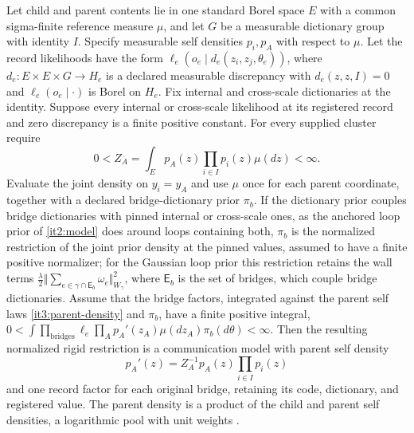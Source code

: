 Let child and parent contents lie in one standard Borel space $E$ with a common sigma-finite reference measure $\mu$, and let $G$ be a measurable dictionary group with identity $I$. Specify measurable self densities $p_i,p_A$ with respect to $\mu$. Let the record likelihoods have the form $\ell_e(o_e\mid d_e(z_i,z_j,\theta_e))$, where $d_e:E\times E\times G\to H_e$ is a declared measurable discrepancy with $d_e(z,z,I)=0$ and $\ell_e(o_e\mid\cdot)$ is Borel on $H_e$. Fix internal and cross-scale dictionaries at the identity. Suppose every internal or cross-scale likelihood at its registered record and zero discrepancy is a finite positive constant. For every supplied cluster require
\begin{equation}
0<Z_A=\int_E p_A(z)\prod_{i\in I}p_i(z)\mu(dz)<\infty.
\label{it3:rigid-normalizer}
\end{equation}
Evaluate the joint density on $y_i=y_A$ and use $\mu$ once for each parent coordinate, together with a declared bridge-dictionary prior $\pi_b$. If the dictionary prior couples bridge dictionaries with pinned internal or cross-scale ones, as the anchored loop prior of \cref{it2:model} does around loops containing both, $\pi_b$ is the normalized restriction of the joint prior density at the pinned values, assumed to have a finite positive normalizer; for the Gaussian loop prior this restriction retains the wall terms $\frac\lambda2\Vert\sum_{e\in\gamma\cap\mathsf E_b}\omega_e\Vert_{W_\gamma}^2$, where $\mathsf E_b$ is the set of bridges, which couple bridge dictionaries. Assume that the bridge factors, integrated against the parent self laws \cref{it3:parent-density} and $\pi_b$, have a finite positive integral, $0<\int\prod_{\mathrm{bridges}}\ell_e\prod_Ap_A'(z_A)\mu(dz_A)\pi_b(d\theta)<\infty$. Then the resulting normalized rigid restriction is a communication model with parent self density
\begin{equation}
p_A'(z)=Z_A^{-1}p_A(z)\prod_{i\in I}p_i(z)
\label{it3:parent-density}
\end{equation}
and one record factor for each original bridge, retaining its code, dictionary, and registered value. The parent density is a product of the child and parent self densities, a logarithmic pool with unit weights \citep{GenestZidek1986}.

